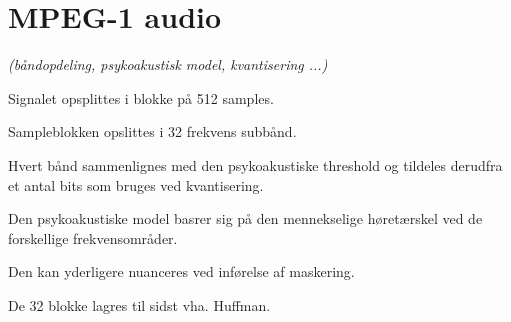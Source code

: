 \newpage
\section{MPEG-1 audio}
\textit{(båndopdeling, psykoakustisk model, kvantisering ...)}

Signalet opsplittes i blokke på 512 samples.

Sampleblokken opslittes i 32 frekvens subbånd.

Hvert bånd sammenlignes med den psykoakustiske threshold og tildeles
derudfra et antal bits som bruges ved kvantisering.

Den psykoakustiske model basrer sig på den mennekselige høretærskel
ved de forskellige frekvensområder.

Den kan yderligere nuanceres ved inførelse af maskering.

De 32 blokke lagres til sidst vha. Huffman.
